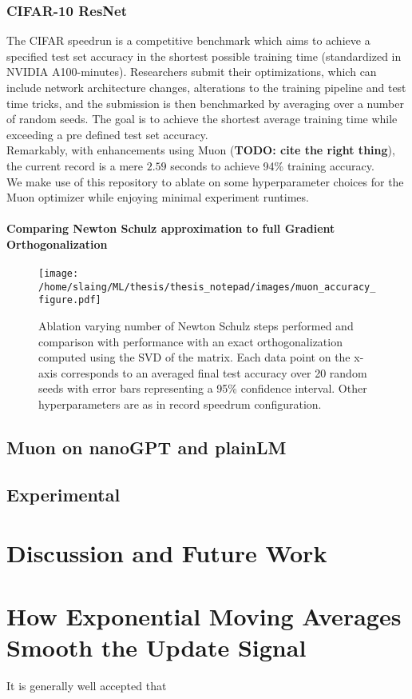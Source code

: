 \documentclass[12pt]{book}
\newcommand{\todo}[1]{{\color{red}\bf{TODO: #1}}}
\begin{document}
\subsection{CIFAR-10 ResNet}
The CIFAR speedrun is a competitive benchmark which aims to achieve a specified test set accuracy in the shortest possible training time (standardized in NVIDIA A100-minutes). Researchers submit their optimizations, which can include network architecture changes, alterations to the training pipeline and test time tricks, and the submission is then benchmarked by averaging over a number of random seeds. The goal is to achieve the shortest average training time while exceeding a pre defined test set accuracy. \\
Remarkably, with enhancements using Muon (\todo{cite the right thing}), the current record is a mere $2.59$ seconds to achieve 94\% training accuracy. 
\\
We make use of this repository to ablate on some hyperparameter choices for the Muon optimizer while enjoying minimal experiment runtimes. 
\\
\subsubsection*{Comparing Newton Schulz approximation to full Gradient Orthogonalization}

\begin{figure}[htbp]
  \centering
  \texttt{[image: /home/slaing/ML/thesis/thesis\_notepad/images/muon\_accuracy\_figure.pdf]}
  \caption{Ablation varying number of Newton Schulz steps performed and comparison with performance with an exact orthogonalization computed using the SVD of the matrix. Each data point on the x-axis corresponds to an averaged final test accuracy over 20 random seeds with error bars representing a 95\% confidence interval. Other hyperparameters are as in record speedrum configuration. }
  \label{fig:muon_cifar_NS}
\end{figure}
\section{Muon on nanoGPT and plainLM} 
\section{Experimental }
\chapter{Discussion and Future Work}


\appendix

\chapter{How Exponential Moving Averages Smooth the Update Signal}
It is generally well accepted that  
\end{document}
